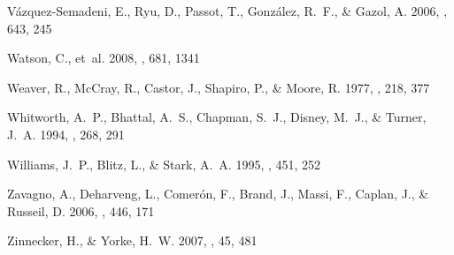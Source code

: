\begin{thebibliography}{39}
{V{\'a}zquez-Semadeni}, E., {Ryu}, D., {Passot}, T., {Gonz{\'a}lez}, R.~F., \&
  {Gazol}, A. 2006, \apj, 643, 245

{Watson}, C., {et~al.} 2008, \apj, 681, 1341

{Weaver}, R., {McCray}, R., {Castor}, J., {Shapiro}, P., \& {Moore}, R. 1977,
  \apj, 218, 377

{Whitworth}, A.~P., {Bhattal}, A.~S., {Chapman}, S.~J., {Disney}, M.~J., \&
  {Turner}, J.~A. 1994, \mnras, 268, 291

{Williams}, J.~P., {Blitz}, L., \& {Stark}, A.~A. 1995, \apj, 451, 252

{Zavagno}, A., {Deharveng}, L., {Comer{\'o}n}, F., {Brand}, J., {Massi}, F.,
  {Caplan}, J., \& {Russeil}, D. 2006, \aap, 446, 171

{Zinnecker}, H., \& {Yorke}, H.~W. 2007, \araa, 45, 481

\end{thebibliography}

%
%
